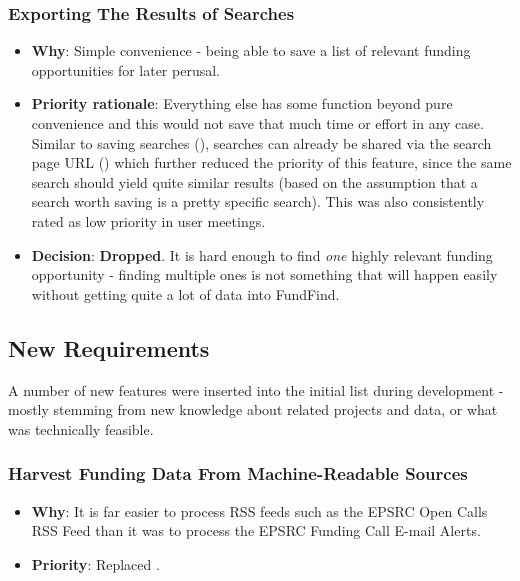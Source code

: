 \subsubsection{Exporting The Results of Searches}
\begin{itemize}
 \item \textbf{Why}: Simple convenience - being able to save a list of relevant funding opportunities for later perusal.
 \item \textbf{Priority rationale}: Everything else has some function beyond pure convenience and this would not save that much time or effort in any case. Similar to saving searches (), searches can already be shared via the search page URL () which further reduced the priority of this feature, since the same search should yield quite similar results (based on the assumption that a search worth saving is a pretty specific search). This was also consistently rated as low priority in user meetings.
 \item \textbf{Decision}: \textbf{Dropped}. It is hard enough to find \emph{one} highly relevant funding opportunity - finding multiple ones is not something that will happen easily without getting quite a lot of data into FundFind.
\end{itemize}

\subsection{New Requirements}
\label{new-reqs}
A number of new features were inserted into the initial list during development - mostly stemming from new knowledge about related projects and data, or what was technically feasible.

\subsubsection{Harvest Funding Data From Machine-Readable Sources}
\begin{itemize}
 \item \textbf{Why}: It is far easier to process RSS feeds such as the EPSRC Open Calls RSS Feed \cite{epsrc-rss} than it was to process the EPSRC Funding Call E-mail Alerts.
 \item \textbf{Priority}: Replaced .
\end{itemize}

